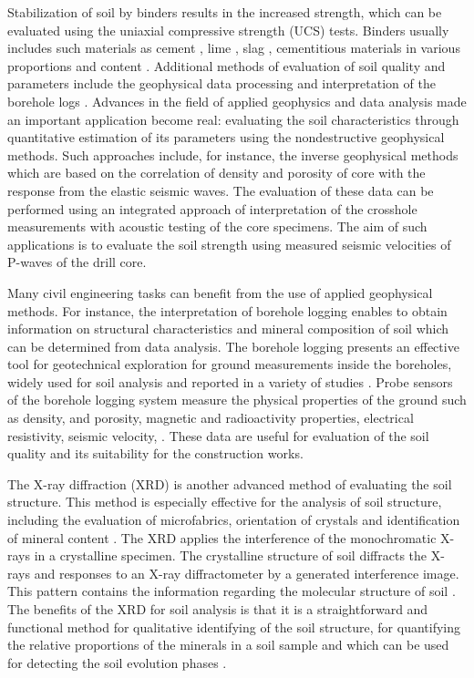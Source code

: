 \documentclass[USenglish,twocolumn]{article}
\begin{document}
Stabilization of soil by binders results in the increased strength, which can be evaluated using the uniaxial compressive strength (UCS) tests. Binders usually includes such materials as cement \cite{Lindh2004,HORPIBULSUK20102011}, lime \cite{OKYAY201034,JAUBERTHIE2010395}, slag \cite{Lindh2021a}, cementitious materials \cite{YOON20102322} in various proportions and content \cite{Lindh2001}. Additional methods of evaluation of soil quality and parameters include the geophysical data processing and interpretation of the borehole logs \cite{LIU2022107048,Rydenetal2016,COMINA2021106278}. Advances in the field of applied geophysics and data analysis made an important application become real: evaluating the soil characteristics through quantitative estimation of its parameters using the nondestructive geophysical methods. Such approaches include, for instance, the inverse geophysical methods which are based on the correlation of density and porosity of core with the response from the elastic seismic waves. The evaluation of these data can be performed using an integrated approach of interpretation of the crosshole measurements with acoustic testing of the core specimens. The aim of such applications is to evaluate the soil strength using measured seismic velocities of P-waves of the drill core. 

Many civil engineering tasks can benefit from the use of applied geophysical methods. For instance, the interpretation of borehole logging enables to obtain information on structural characteristics and mineral composition of soil which can be determined from data analysis. The borehole logging presents an effective tool for geotechnical exploration for ground measurements inside the boreholes, widely used for soil analysis and reported in a variety of studies \cite{KALERIS2015135,DIAS2020107099,YU2022127817,YU2021126010}. Probe sensors of the borehole logging system measure the physical properties of the ground such as density, and porosity, magnetic and radioactivity properties, electrical resistivity, seismic velocity, 
\cite{KILLEEN2015447}. These data are useful for evaluation of the soil quality and its suitability for the construction works.

The X-ray diffraction (XRD) is another advanced method of evaluating the soil structure. This method is especially effective for the analysis of soil structure, including the evaluation of microfabrics, orientation of crystals and identification of mineral content \cite{Denaix,Das,Righi}. The XRD applies the interference of the monochromatic X-rays in a crystalline specimen. The crystalline structure of soil diffracts the X-rays and responses to an X-ray diffractometer by a generated interference image. This pattern contains the information regarding the molecular structure of soil \cite{ALDERTON2021520}. The benefits of the XRD for soil analysis is that it is a straightforward and functional method for qualitative identifying of the soil structure, for quantifying the relative proportions of the minerals in a soil sample and which can be used for detecting the soil evolution phases \cite{ADAMS2019391}.
\end{document}
